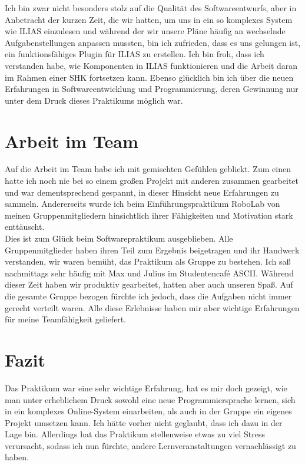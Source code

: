 \documentclass[a4paper]{scrreprt}
\begin{document}
Ich bin zwar nicht besonders stolz auf die Qualität des Softwareentwurfs, aber in Anbetracht der kurzen Zeit, die wir hatten, um uns in ein so komplexes System wie ILIAS einzulesen und während der wir unsere Pläne häufig an wechselnde Aufgabenstellungen anpassen mussten, bin ich zufrieden, dass es uns gelungen ist, ein funktionsfähiges Plugin für ILIAS zu erstellen. Ich bin froh, dass ich verstanden habe, wie Komponenten in ILIAS funktionieren und die Arbeit daran im Rahmen einer SHK fortsetzen kann. Ebenso glücklich bin ich über die neuen Erfahrungen in Softwareentwicklung und Programmierung, deren Gewinnung nur unter dem Druck dieses Praktikums möglich war.

\section{Arbeit im Team}
Auf die Arbeit im Team habe ich mit gemischten Gefühlen geblickt. Zum einen hatte ich noch nie bei so einem großen Projekt mit anderen zusammen gearbeitet und war dementsprechend gespannt, in dieser Hinsicht neue Erfahrungen zu sammeln. Andererseits wurde ich beim Einführungspraktikum RoboLab von meinen Gruppenmitgliedern hinsichtlich ihrer Fähigkeiten und Motivation stark enttäuscht.\\
Dies ist zum Glück beim Softwarepraktikum ausgeblieben. Alle Gruppenmitglieder haben ihren Teil zum Ergebnis beigetragen und ihr Handwerk verstanden, wir waren bemüht, das Praktikum als Gruppe zu bestehen. Ich saß nachmittags sehr häufig mit Max und Julius im Studentencafé ASCII. Während dieser Zeit haben wir produktiv gearbeitet, hatten aber auch unseren Spaß. Auf die gesamte Gruppe bezogen fürchte ich jedoch, dass die Aufgaben nicht immer gerecht verteilt waren. Alle diese Erlebnisse haben mir aber wichtige Erfahrungen für meine Teamfähigkeit geliefert.

\section{Fazit}
Das Praktikum war eine sehr wichtige Erfahrung, hat es mir doch gezeigt, wie man unter erheblichem Druck sowohl eine neue Programmiersprache lernen, sich in ein komplexes Online-System einarbeiten, als auch in der Gruppe ein eigenes Projekt umsetzen kann. Ich hätte vorher nicht geglaubt, dass ich dazu in der Lage bin. Allerdings hat das Praktikum stellenweise etwas zu viel Stress verursacht, sodass ich nun fürchte, andere Lernveranstaltungen vernachlässigt zu haben.
\end{document}
